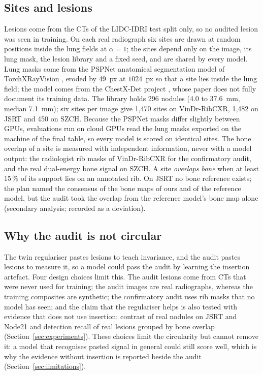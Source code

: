 \subsection{Sites and lesions}
Lesions come from the CTs of the LIDC-IDRI test split only, so no audited lesion was seen in training. On each real radiograph six sites are drawn at random
positions inside the lung fields at $\alpha=1$; the sites depend only on the image, its lung mask, the lesion library and a fixed seed, and are shared by
every model. Lung masks come from the PSPNet anatomical segmentation model of TorchXRayVision \citep{cohen2022torchxrayvision}, eroded by
49~px at $1024$~px so that a site lies inside the lung field; the model comes from the ChestX-Det project \citep{lian2021chestxdet}, whose paper does not fully
document its training data. The library holds 296 nodules
(4.0 to 37.6~mm, median 7.1~mm); six sites per image give 1,470 sites on VinDr-RibCXR, 1,482 on JSRT and 450 on SZCH. Because the PSPNet masks
differ slightly between GPUs, evaluations run on cloud GPUs read the lung masks exported on the machine of the final table, so every model is
scored on identical sites.
The bone overlap of a site is measured with independent information, never with a model output: the radiologist rib masks of VinDr-RibCXR
\citep{nguyen2021ribcxr} for the confirmatory audit, and the real dual-energy bone signal on SZCH. A site \emph{overlaps bone} when at least 15\,\% of its
support lies on an annotated rib. On JSRT no bone reference exists; the plan named the consensus of the bone maps of ours and of the reference
model, but the audit took the overlap from the reference model's bone map alone (secondary analysis; recorded as a deviation).

\subsection{Why the audit is not circular}
The twin regulariser pastes lesions to teach invariance, and the audit pastes lesions to measure it, so a model could pass the audit by learning the
insertion artefact. Four design choices limit this. The audit lesions come from CTs that were never used for training; the audit images are real
radiographs, whereas the training composites are synthetic; the confirmatory audit uses rib masks that no model has seen; and the claim that the
regulariser helps is also tested with evidence that does not use insertion: contrast of real nodules on JSRT and Node21 and detection recall of real
lesions grouped by bone overlap (Section~\ref{sec:experiments}). These choices limit the circularity but cannot remove it: a model that recognises
pasted signal in general could still score well, which is why the evidence without insertion is reported beside the audit (Section~\ref{sec:limitations}).

